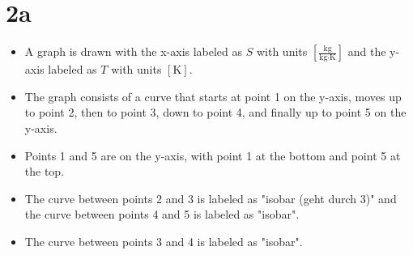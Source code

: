 

\section*{2a}

\begin{itemize}
    \item A graph is drawn with the x-axis labeled as $S$ with units $\left[\frac{\text{kg}}{\text{kg} \cdot \text{K}}\right]$ and the y-axis labeled as $T$ with units $[\text{K}]$.
    \item The graph consists of a curve that starts at point 1 on the y-axis, moves up to point 2, then to point 3, down to point 4, and finally up to point 5 on the y-axis.
    \item Points 1 and 5 are on the y-axis, with point 1 at the bottom and point 5 at the top.
    \item The curve between points 2 and 3 is labeled as "isobar (geht durch 3)" and the curve between points 4 and 5 is labeled as "isobar".
    \item The curve between points 3 and 4 is labeled as "isobar".
\end{itemize}
